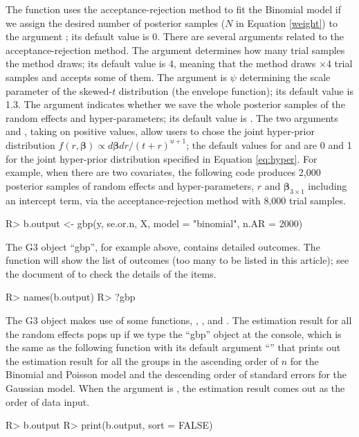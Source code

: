 \documentclass[article]{jss}
\begin{document}
The function  uses the acceptance-rejection method to fit the Binomial model if we assign the desired number of posterior samples ($N$ in Equation \ref{weight}) to the argument ; its default value is 0. There are several arguments related to the acceptance-rejection method. The argument  determines how many trial samples the method draws; its default value is 4, meaning that the method draws  $\times4$ trial samples and accepts some of them. The argument  is $\psi$ determining the scale parameter of the skewed-$t$ distribution (the envelope function); its default value is 1.3. The argument  indicates whether we save the whole posterior samples of the random effects and hyper-parameters; its default value is . The two arguments  and , taking on positive values, allow users to chose the joint hyper-prior distribution $f(r, \boldsymbol{\beta})\propto d\boldsymbol{\beta}dr/(t+r)^{u+1}$; the default values for  and  are 0 and 1 for the joint hyper-prior distribution specified in Equation \ref{eq:hyper}. For example, when there are two covariates, the following code produces 2,000 posterior samples of random effects and hyper-parameters, $r$ and $\boldsymbol{\beta}_{3\times1}$ including an intercept term, via the acceptance-rejection method with 8,000 trial samples.
\begin{CodeChunk}
\begin{CodeInput}
R> b.output <- gbp(y, se.or.n, X, model = "binomial", n.AR = 2000)
\end{CodeInput}
\end{CodeChunk}

The G3 object ``gbp'', for example  above, contains detailed outcomes. The function  will show the list of outcomes (too many to be listed in this article); see the document of  to check the details of the items.
\begin{CodeChunk}
\begin{CodeInput}
R> names(b.output)
R> ?gbp
\end{CodeInput}
\end{CodeChunk}

The G3 object makes use of some functions, , , and . The estimation result for all the random effects pops up if we type the ``gbp'' object at the  console, which is the same as the following function  with its default argument ``'' that prints out the estimation result for all the groups in the ascending order of $n$ for the Binomial and Poisson model and the descending order of standard errors for the Gaussian model. When the argument  is , the estimation result comes out as the order of data input.
\begin{CodeChunk}
\begin{CodeInput}
R> b.output
R> print(b.output, sort = FALSE)
\end{CodeInput}
\end{CodeChunk}
\end{document}
